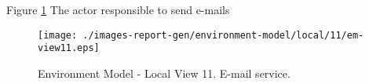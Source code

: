 
Figure \ref{fig:lu.uni.lassy.excalibur.examples.icrash-EM-view-local-11} The actor responsible to send e-mails


\begin{figure}[htbp] 
\label{fig:lu.uni.lassy.excalibur.examples.icrash-EM}
\begin{center}
\texttt{[image: ./images-report-gen/environment-model/local/11/em-view11.eps]}
\end{center}
\caption[Environment Model - Local View 11 - E-mail service]{Environment Model - Local View 11. E-mail service.}
\label{fig:lu.uni.lassy.excalibur.examples.icrash-EM-view-local-11}
\end{figure}
\vspace{0.5cm} 
